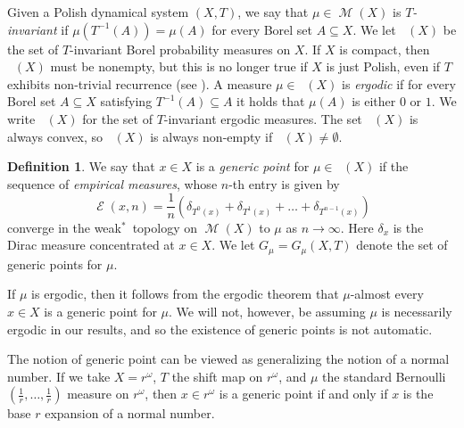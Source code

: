 \documentclass{amsart}
\theoremstyle{definition}
\newtheorem{defn}[thm]{Definition}
\newcommand{\base}{r}
\DeclareMathOperator{\Emp}{\mathcal{E}}%
\DeclareMathOperator{\M}{\mathcal{M}}
\DeclareMathOperator{\MT}{\mathcal{M}_{\mathit T} }
\DeclareMathOperator{\MTe}{\M_{\mathit T}^e}
\newcommand{\weakst}{weak$^*$}
\begin{document}
Given a Polish dynamical system $(X,T)$, we say that $\mu \in \M(X)$ is
\emph{$T$-invariant} if $\mu(T^{-1}(A))=\mu(A)$ for every Borel set $A \subseteq X$.
We let $\MT(X)$ be the set of $T$-invariant Borel probability measures on $X$.
If $X$ is compact, then $\MT(X)$ must be nonempty, but this is no longer true if $X$ is just Polish, even if $T$ exhibits non-trivial recurrence (see \cite[p. 374]{GM}).
A measure $\mu\in\MT(X)$ is \emph{ergodic} if  for every Borel set $A\subseteq X$ satisfying $T^{-1}(A)\subseteq A$ it holds that $\mu(A)$ is either $0$ or $1$. We write $\MTe(X)$ for the set of $T$-invariant ergodic measures. The set $\MT(X)$ is always convex, so $\MTe(X)$ is always non-empty if $\MT(X)\neq\emptyset$.

\begin{defn}
We say that $x \in X$ is a \emph{generic point} for
$\mu\in \MT(X)$ if the sequence of \emph{empirical measures}, whose $n$-th entry is given by
\begin{equation}\label{eqn:empirical}
 \Emp(x,n)= \frac{1}{n}(\delta_{T^0(x)}+\delta_{T^1(x)}+\dots +\delta_{T^{n-1}(x)})\end{equation}
converge in the \weakst\ topology on $\M(X)$ to $\mu$ as $n\to\infty$.
Here $\delta_x$ is the Dirac measure concentrated at $x\in X$.
We let $G_\mu=G_\mu(X,T)$ denote the set of generic points for $\mu$.
\end{defn}
If $\mu$ is ergodic, then it follows from the ergodic theorem that
$\mu$-almost every $x \in X$ is a generic point for $\mu$. We will not, however,
be assuming $\mu$ is necessarily ergodic in our results, and so the
existence of generic points is not automatic.

The notion of generic point can be viewed as generalizing the notion of a normal number.
If we take $X=\base^\omega$, $T$ the shift map on $\base^\omega$, and $\mu$ the standard Bernoulli
$(\frac{1}{\base},\ldots,\frac{1}{\base})$ measure on $\base^\omega$, then $x \in \base^\omega$ is a generic point
if and only if $x$ is the base $\base$ expansion of a normal number.
\end{document}
